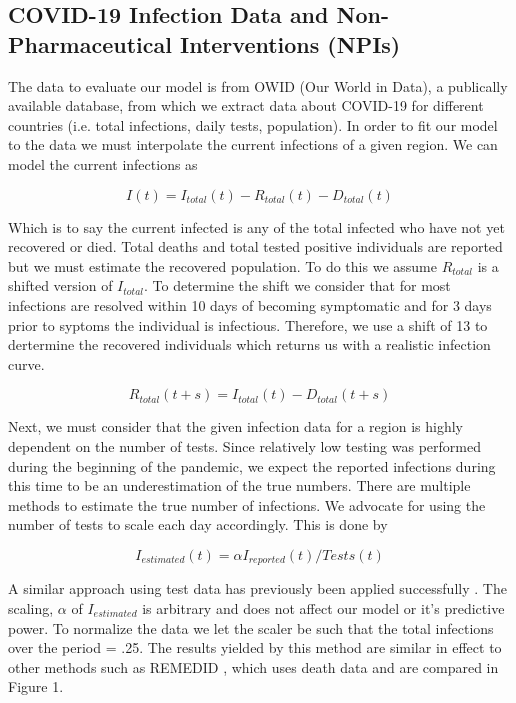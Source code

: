 \documentclass[letterpaper, 10 pt, conference]{ieeeconf}  %
\begin{document}
\subsection{COVID-19 Infection Data and Non-Pharmaceutical Interventions (NPIs)}

The data to evaluate our model is from OWID (Our World in Data), a publically available database, from which we extract data about COVID-19 for different countries (i.e. total infections, daily tests, population). In order to fit our model to the data we must interpolate the current infections of a given region. We can model the current infections as

\begin{equation*}
I(t) = I_{total}(t) - R_{total}(t) - D_{total}(t)
\end{equation*}

Which is to say the current infected is any of the total infected who have not yet recovered or died. Total deaths and total tested positive individuals are reported but we must estimate the recovered population. To do this we assume $R_{total}$ is a shifted version of $I_{total}$. To determine the shift we consider that for most infections are resolved within 10 days of becoming symptomatic and for 3 days prior to syptoms the individual is infectious. Therefore, we use a shift of 13 to dertermine the recovered individuals which returns us with a realistic infection curve.

\begin{equation*}
R_{total}(t + s) = I_{total}(t) - D_{total}(t+s)
\end{equation*}

Next, we must consider that the given infection data for a region is highly dependent on the number of tests. Since relatively low testing was performed during the beginning of the pandemic, we expect the reported infections during this time to be an underestimation of the true numbers. There are multiple methods to estimate the true number of infections. We advocate for using the number of tests to scale each day accordingly. This is done by 

\begin{equation*}
I_{estimated}(t) = \alpha I_{reported}(t) / Tests(t)
\end{equation*}

A similar approach using test data has previously been applied successfully \cite{Ironse2103272118}. The scaling, $\alpha$ of $I_{estimated}$ is arbitrary and does not affect our model or it's predictive power. To normalize the data we let the scaler be such that the total infections over the period = .25. The results yielded by this method are similar in effect to other methods such as REMEDID \cite{GarcaGarca2021RetrospectiveMT}, which uses death data and are compared in Figure 1.
\end{document}
